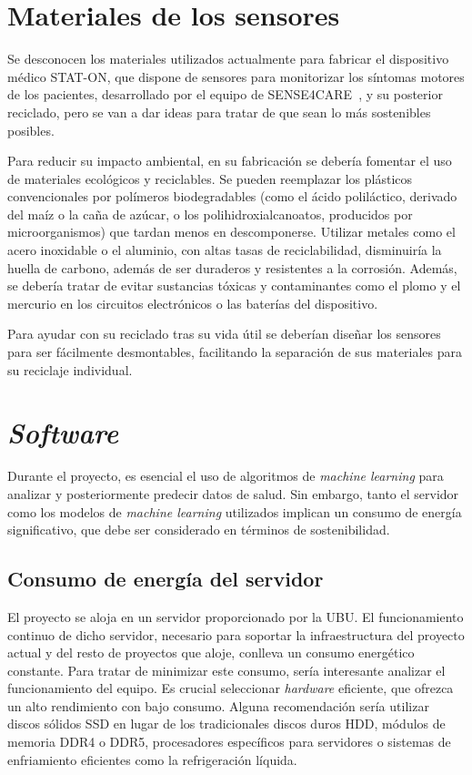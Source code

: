 \section{Materiales de los sensores}
Se desconocen los materiales utilizados actualmente para fabricar el dispositivo médico STAT-ON, que dispone de sensores para monitorizar los síntomas motores de los pacientes, desarrollado por el equipo de SENSE4CARE~\cite{sense4care}, y su posterior reciclado, pero se van a dar ideas para tratar de que sean lo más sostenibles posibles.

Para reducir su impacto ambiental, en su fabricación se debería fomentar el uso de materiales ecológicos y reciclables. Se pueden reemplazar los plásticos convencionales por polímeros biodegradables (como el ácido poliláctico, derivado del maíz o la caña de azúcar, o los polihidroxialcanoatos, producidos por microorganismos) que tardan menos en descomponerse. Utilizar metales como el acero inoxidable o el aluminio, con altas tasas de reciclabilidad, disminuiría la huella de carbono, además de ser duraderos y resistentes a la corrosión. Además, se debería tratar de evitar sustancias tóxicas y contaminantes como el plomo y el mercurio en los circuitos electrónicos o las baterías del dispositivo.

Para ayudar con su reciclado tras su vida útil se deberían diseñar los sensores para ser fácilmente desmontables, facilitando la separación de sus materiales para su reciclaje individual.


\section{\textit{Software}}
Durante el proyecto, es esencial el uso de algoritmos de \textit{machine learning} para analizar y posteriormente predecir datos de salud. Sin embargo, tanto el servidor como los modelos de \textit{machine learning} utilizados implican un consumo de energía significativo, que debe ser considerado en términos de sostenibilidad.

\subsection{Consumo de energía del servidor}
El proyecto se aloja en un servidor proporcionado por la UBU. El funcionamiento continuo de dicho servidor, necesario para soportar la infraestructura del proyecto actual y del resto de proyectos que aloje, conlleva un consumo energético constante. Para tratar de minimizar este consumo, sería interesante analizar el funcionamiento del equipo. Es crucial seleccionar \textit{hardware} eficiente, que ofrezca un alto rendimiento con bajo consumo. Alguna recomendación sería utilizar discos sólidos SSD en lugar de los tradicionales discos duros HDD, módulos de memoria DDR4 o DDR5, procesadores específicos para servidores o sistemas de enfriamiento eficientes como la refrigeración líquida.

